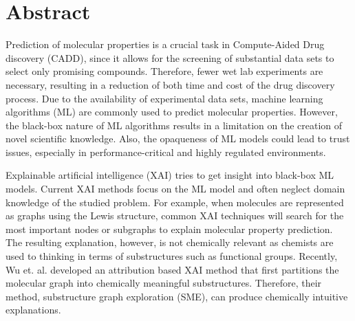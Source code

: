 \chapter{Abstract}


Prediction of molecular properties is a crucial task in Compute-Aided 
Drug discovery (CADD), since it allows for the screening of substantial 
data sets to select only promising compounds. Therefore, fewer wet lab experiments are necessary, 
resulting in a reduction of both time and cost of the drug discovery process.\cite{adelusi2022molecular} 
Due to the availability of experimental data sets, machine learning 
algorithms (ML) are commonly used to predict molecular properties.\cite{wu2018moleculenet, gorgulla2022emerging, tropsha2024integrating} 
However, the black-box nature of ML algorithms 
results in a limitation on the creation of novel scientific knowledge. Also, 
the opaqueness of ML models could lead to trust issues, especially 
in performance-critical and highly regulated environments.\cite{carvalho2019machine}


% 


Explainable artificial intelligence (XAI) tries to get insight into black-box 
ML models.\cite{carvalho2019machine, yuan2022explainability} 
Current XAI methods focus on the ML model and often neglect domain 
knowledge of the studied problem. For example, when molecules are represented 
as graphs using the Lewis structure\cite{ahmad1992drawing}, common XAI techniques will search for the 
most important nodes or subgraphs to explain molecular property prediction.\cite{wu2023chemistry} The 
resulting explanation, however, is not chemically relevant as chemists are used 
to thinking in terms of substructures such as functional groups. Recently, Wu et. 
al. developed an attribution based XAI method that first partitions the molecular graph into 
chemically meaningful substructures. Therefore, their method, substructure graph 
exploration (SME), can produce chemically intuitive explanations.\cite{wu2023chemistry}


